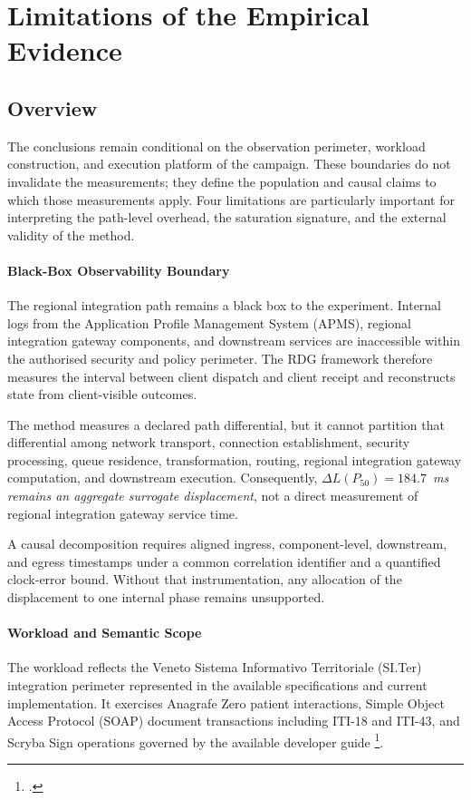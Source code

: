 \section{Limitations of the Empirical Evidence}
\label{sec:conclusions-limitations}
\subsection{Overview}
\noindent The conclusions remain conditional on the observation perimeter, workload
construction, and execution platform of the campaign. These boundaries do not
invalidate the measurements; they define the population and causal claims to
which those measurements apply. Four limitations are particularly important
for interpreting the path-level overhead, the saturation signature, and the
external validity of the method.

\paragraph{Black-Box Observability Boundary}
\noindent The regional integration path remains a black box to the experiment. Internal
logs from the Application Profile Management System (APMS), regional integration gateway components,
and downstream services are inaccessible within the authorised security and
policy perimeter. The RDG framework therefore measures the
interval between client dispatch and client receipt and reconstructs state from
client-visible outcomes.

\noindent The method measures a declared path differential, but it cannot partition
that differential among network transport, connection establishment, security
processing, queue residence, transformation, routing, regional integration gateway computation, and
downstream execution. Consequently, \emph{$\Delta L(P_{50})=184.7$~ms remains
an aggregate surrogate displacement}, not a direct measurement of regional integration gateway
service time.

\noindent A causal decomposition requires aligned ingress, component-level,
downstream, and egress timestamps under a common correlation identifier and a
quantified clock-error bound. Without that instrumentation, any allocation of
the displacement to one internal phase remains unsupported.

\paragraph{Workload and Semantic Scope}
\noindent The workload reflects the Veneto Sistema Informativo Territoriale (SI.Ter)
integration perimeter represented in the available specifications and current
implementation. It exercises Anagrafe Zero patient interactions, Simple Object
Access Protocol (SOAP) document transactions including ITI-18 and ITI-43, and
Scryba Sign operations governed by the available developer guide
\footcites{arsenal-anagrafe-zero-v26,affinity-domain-italia-v263}
{scryba-sign-developer-guide-v16}.

